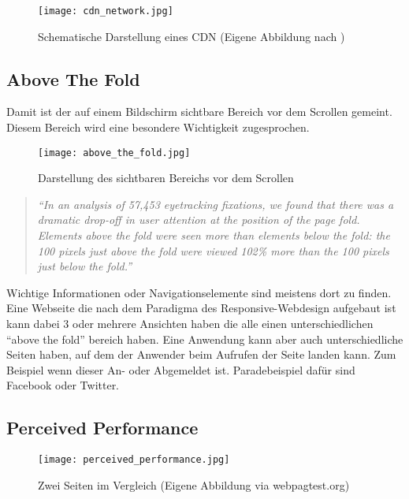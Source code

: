 		\begin{figure}[htbp]
			\begin{center}
				\texttt{[image: cdn\_network.jpg]}
				\caption{Schematische Darstellung eines CDN (Eigene Abbildung nach \autocite{ritz14})}
				\label{fig:cdn_network}
			\end{center}
		\end{figure}
		


	\subsection{Above The Fold} %
	\label{sub:above_the_fold}
		Damit ist der auf einem Bildschirm sichtbare Bereich vor dem Scrollen gemeint. Diesem Bereich wird eine besondere Wichtigkeit zugesprochen.
		\begin{figure}[htbp]
			\begin{center}
				\texttt{[image: above\_the\_fold.jpg]}
				\caption{Darstellung des sichtbaren Bereichs vor dem Scrollen}
				\label{fig:above_the_fold}
			\end{center}
		\end{figure}

		\begin{quote}
			 \textit{"`In an analysis of 57,453 eyetracking fixations, we found that there was a dramatic drop-off in user attention at the position of the page fold. Elements above the fold were seen more than elements below the fold: the 100 pixels just above the fold were viewed 102\% more than the 100 pixels just below the fold."'} \autocite{nng15}
		\end{quote}

		Wichtige Informationen oder Navigationselemente sind meistens dort zu finden. Eine Webseite die nach dem Paradigma des Responsive-Webdesign aufgebaut ist kann dabei 3 oder mehrere Ansichten haben die alle einen unterschiedlichen "`above the fold"' bereich haben. Eine Anwendung kann aber auch unterschiedliche Seiten haben, auf dem der Anwender beim Aufrufen der Seite landen kann. Zum Beispiel wenn dieser An- oder Abgemeldet ist. Paradebeispiel dafür sind Facebook oder Twitter.




	\subsection{Perceived Performance} %
	\label{sub:perceived_performance}
		\begin{figure}[htbp]
			\begin{center}
				\texttt{[image: perceived\_performance.jpg]}
				\caption{Zwei Seiten im Vergleich (Eigene Abbildung via webpagtest.org)}
				\label{fig:perceived_performance}
			\end{center}
		\end{figure}


